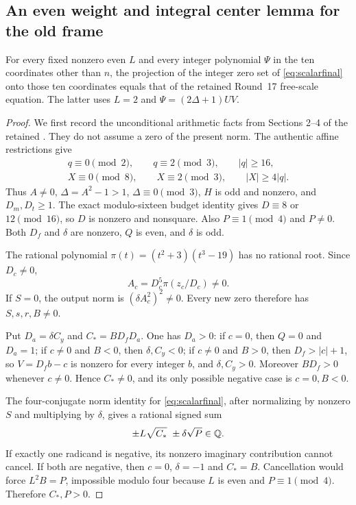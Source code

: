 \subsection{An even weight and integral center lemma for the old frame}
\begin{theorem}\label{thm:evenweight}
For every fixed nonzero even $L$ and every integer polynomial $\Psi$ in
the ten coordinates other than $n$, the projection of the integer zero
set of \eqref{eq:scalarfinal} onto those ten coordinates equals that of
the retained Round~17 free-scale equation. The latter uses
$L=2$ and $\Psi=(2\Delta+1)UV$.
\end{theorem}
\begin{proof}
We first record the unconditional arithmetic facts from Sections 2--4
of the retained . They do not
assume a zero of the present norm. The authentic affine restrictions give
\begin{gather*}
 q\equiv0\pmod2,\qquad q\equiv2\pmod3,\qquad |q|\ge16,\\
 X\equiv0\pmod8,\qquad X\equiv2\pmod3,\qquad |X|\ge4|q|.
\end{gather*}
Thus $A\ne0$, $\Delta=A^2-1>1$, $\Delta\equiv0\pmod3$,
$H$ is odd and nonzero, and $D_m,D_t\ge1$. The exact modulo-sixteen
budget identity gives $D\equiv8$ or $12\pmod{16}$, so $D$ is nonzero
and nonsquare. Also $P\equiv1\pmod4$ and $P\ne0$.
Both $D_f$ and $\delta$ are nonzero, $Q$ is even, and $\delta$ is odd.

The rational polynomial $\pi(t)=(t^2+3)(t^3-19)$ has no rational root.
Since $D_c\ne0$,
\[
 A_c=D_c^5\pi(z_c/D_c)\ne0.
\]
If $S=0$, the output norm is $(\delta A_c^2)^2\ne0$.
Every new zero therefore has $S,s,r,B\ne0$.

Put $D_a=\delta C_y$ and $C_*=BD_fD_a$. One has $D_a>0$:
if $c=0$, then $Q=0$ and $D_a=1$; if $c\ne0$ and $B<0$,
then $\delta,C_y<0$; if $c\ne0$ and $B>0$, then
$D_f>|c|+1$, so $V=D_fb-c$ is nonzero for every integer $b$, and
$\delta,C_y>0$. Moreover $BD_f>0$ whenever $c\ne0$.
Hence $C_*\ne0$, and its only possible negative case is $c=0,B<0$.

The four-conjugate norm identity for \eqref{eq:scalarfinal}, after
normalizing by nonzero $S$ and multiplying by $\delta$, gives a rational
signed sum
\begin{equation}\label{eq:radicalsum}
 \pm L\sqrt{C_*}\ \pm\delta\sqrt P\in\mathbb Q.
\end{equation}
If exactly one radicand is negative, its nonzero imaginary contribution
cannot cancel. If both are negative, then $c=0$, $\delta=-1$ and
$C_*=B$. Cancellation would force $L^2B=P$, impossible modulo four
because $L$ is even and $P\equiv1\pmod4$. Therefore $C_*,P>0$.


\end{proof}

